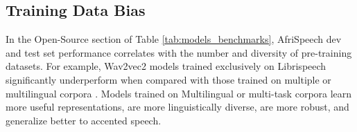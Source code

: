 \documentclass[11pt,a4paper]{article}
\begin{document}
\subsection{Training Data Bias} In the Open-Source section of Table \ref{tab:models_benchmarks}, AfriSpeech dev and test set performance correlates with the number and diversity of pre-training datasets. For example, Wav2vec2 models trained exclusively on Librispeech significantly underperform when compared with those trained on multiple \citep{Baevski2020wav2vec2A} or multilingual corpora \citep{Babu2022XLSRSC}. Models trained on Multilingual or multi-task corpora \citep{radford2022robust, gulati2020conformer} learn more useful representations, are more linguistically diverse, are more robust, and generalize better to accented speech. %
\end{document}
